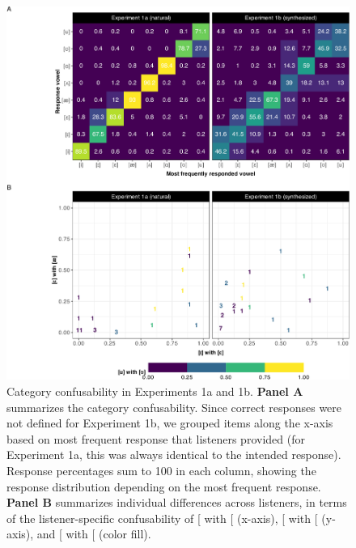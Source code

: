 \documentclass[preprint]{JASA}
\begin{document}
\begin{figure}[!ht]

{\centering \includegraphics[width=0.9\linewidth]{./Figure5} 

}

\caption{Category confusability in Experiments 1a and 1b. \textbf{Panel A} summarizes the category confusability. Since correct responses were not defined for Experiment 1b, we grouped items along the x-axis based on most frequent response that listeners provided (for Experiment 1a, this was always identical to the intended response). Response percentages sum to 100 in each column, showing the response distribution depending on the most frequent response. \textbf{Panel B} summarizes individual differences across listeners, in terms of the listener-specific confusability of {[}\textipa{I}{]} with {[}\textipa{E}{]} (x-axis), {[}\textipa{E}{]} with {[}\textipa{\ae}{]} (y-axis), and {[}\textipa{u}{]} with {[}\textipa{U}{]} (color fill).}\label{fig:human-confusion}
\end{figure}
\end{document}
